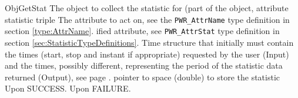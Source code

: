 \begin{prototype}{ObjGetStat}
			{\pInput}{The object to collect the statistic for (part of the object, attribute statistic triple}
			{\pInput}{The attribute to act on, see the \texttt{PWR_AttrName} type definition in section \ref{type:AttrName}.}
		{\pInput}{ified attribute, see \texttt{PWR_AttrStat} type definition in section \ref{sec:StatisticTypeDefinitions}.}
		{\pInputOutput}{Time structure that initially must contain the times (start, stop and instant if appropriate) requested by the user (Input) and the times, possibly      different, representing the period of the statistic data returned (Output), see page \pageref{type:TimePeriod}.}
			{\pOutput}{pointer to space (double) to store the statistic}
	 {Upon SUCCESS.}
	 {Upon FAILURE.}
\end{prototype}

